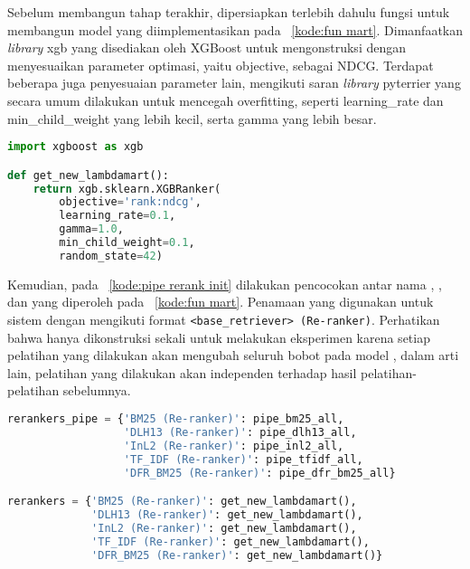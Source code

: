 Sebelum membangun \pipeline{} tahap \ranking{} terakhir, dipersiapkan terlebih dahulu fungsi untuk membangun model \lambdamart{} yang diimplementasikan pada \kode{}~\ref{kode:fun mart}. Dimanfaatkan \textit{library} xgb yang disediakan oleh XGBoost untuk mengonstruksi \lambdamart{} dengan menyesuaikan parameter optimasi, yaitu objective, sebagai NDCG. Terdapat beberapa juga penyesuaian parameter lain, mengikuti saran \textit{library} pyterrier yang secara umum dilakukan untuk mencegah overfitting, seperti learning\_rate dan min\_child\_weight yang lebih kecil, serta gamma yang lebih besar.
\begin{lstlisting}[language=Python, caption={Pembentukan model \lambdamart{}}, label={kode:fun mart}]
import xgboost as xgb

def get_new_lambdamart():
    return xgb.sklearn.XGBRanker(
        objective='rank:ndcg',
        learning_rate=0.1,
        gamma=1.0,
        min_child_weight=0.1,
        random_state=42)
\end{lstlisting}

Kemudian, pada \kode{}~\ref{kode:pipe rerank init} dilakukan pencocokan antar nama \pipeline{}, \pipeline{}, dan \reranker{} \lambdamart{} yang diperoleh pada \kode{}~\ref{kode:fun mart}. Penamaan yang digunakan untuk sistem \ir{} dengan \reranker{} mengikuti format \lstinline{<base_retriever> (Re-ranker)}. Perhatikan bahwa \lambdamart{} hanya dikonstruksi sekali untuk melakukan eksperimen karena setiap pelatihan yang dilakukan akan mengubah seluruh bobot pada model \lambdamart{}, dalam arti lain, pelatihan yang dilakukan akan independen terhadap hasil pelatihan-pelatihan sebelumnya.
\begin{lstlisting}[language=Python, caption={Pencocokan \pipeline{} \reranker{}}, label={kode:pipe rerank init}]
rerankers_pipe = {'BM25 (Re-ranker)': pipe_bm25_all,
                  'DLH13 (Re-ranker)': pipe_dlh13_all,
                  'InL2 (Re-ranker)': pipe_inl2_all,
                  'TF_IDF (Re-ranker)': pipe_tfidf_all,
                  'DFR_BM25 (Re-ranker)': pipe_dfr_bm25_all}

rerankers = {'BM25 (Re-ranker)': get_new_lambdamart(),
             'DLH13 (Re-ranker)': get_new_lambdamart(),
             'InL2 (Re-ranker)': get_new_lambdamart(),
             'TF_IDF (Re-ranker)': get_new_lambdamart(),
             'DFR_BM25 (Re-ranker)': get_new_lambdamart()}
\end{lstlisting}

